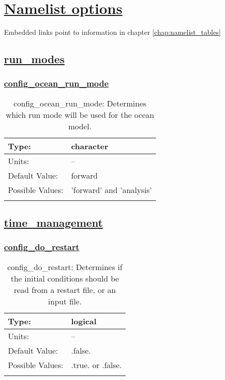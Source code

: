 \chapter[Namelist options]{\hyperref[chap:namelist_tables]{Namelist options}}
\label{chap:namelist_sections}
Embedded links point to information in chapter \ref{chap:namelist_tables}
\section[run\_modes]{\hyperref[sec:nm_tab_run_modes]{run\_modes}}
\label{sec:nm_sec_run_modes}
\subsection[config\_ocean\_run\_mode]{\hyperref[sec:nm_tab_run_modes]{config\_ocean\_run\_mode}}
\label{subsec:nm_sec_config_ocean_run_mode}
\begin{center}
\begin{longtable}{| p{2.0in} || p{4.0in} |}
    \hline
    Type: & character \\
    \hline
    Units: & -- \\
    \hline
    Default Value: & forward \\
    \hline
    Possible Values: & 'forward' and 'analysis' \\
    \hline
    \caption{config\_ocean\_run\_mode: Determines which run mode will be used for the ocean model.}
\end{longtable}
\end{center}
\section[time\_management]{\hyperref[sec:nm_tab_time_management]{time\_management}}
\label{sec:nm_sec_time_management}
\subsection[config\_do\_restart]{\hyperref[sec:nm_tab_time_management]{config\_do\_restart}}
\label{subsec:nm_sec_config_do_restart}
\begin{center}
\begin{longtable}{| p{2.0in} || p{4.0in} |}
    \hline
    Type: & logical \\
    \hline
    Units: & -- \\
    \hline
    Default Value: & .false. \\
    \hline
    Possible Values: & .true. or .false. \\
    \hline
    \caption{config\_do\_restart: Determines if the initial conditions should be read from a restart file, or an input file.}
\end{longtable}
\end{center}
